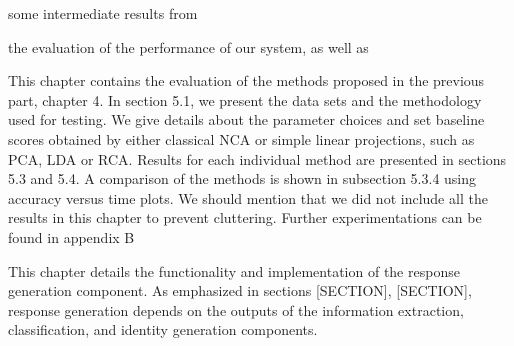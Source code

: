 some intermediate results from 

the evaluation of the performance of our system, as well as 


This chapter contains the evaluation of the methods proposed in the previous
part, chapter 4. In section 5.1, we present the data sets and the methodology
used for testing. We give details about the parameter choices and set baseline
scores obtained by either classical NCA or simple linear projections, such as PCA,
LDA or RCA. Results for each individual method are presented in sections 5.3
and 5.4. A comparison of the methods is shown in subsection 5.3.4 using accuracy
versus time plots.
We should mention that we did not include all the results in this chapter to
prevent cluttering. Further experimentations can be found in appendix B

This chapter details the functionality and implementation of the response generation component. As emphasized in sections [SECTION], [SECTION], response generation depends on the outputs of the information extraction, classification, and identity generation components. 


